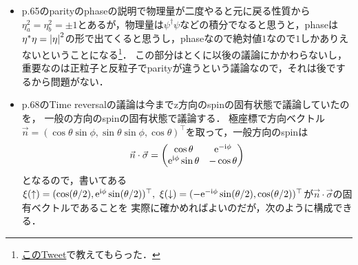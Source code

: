 \begin{itemize}
	\item p.65のparityのphaseの説明で物理量が二度やると元に戻る性質から$\eta_a^2 = \eta_b^2 = \pm1$とあるが，物理量は$\psi^{\dagger}\psi$などの積分でなると思うと，phaseは$\eta^{*}\eta = \abs{\eta}^2$の形で出てくると思うし，phaseなので絶対値$1$なので$1$しかありえないということになる\footnote{\href{https://twitter.com/san_wkwk/status/1596176870751752192?s=20&t=r0nJYSPKDf_OSyPgOmz2oA}{このTweet}で教えてもらった．}．
		この部分はとくに以後の議論にかかわらないし，重要なのは正粒子と反粒子でparityが違うという議論なので，それは後でするから問題がない．
	\item p.68のTime reversalの議論は今までz方向のspinの固有状態で議論していたのを，
		一般の方向のspinの固有状態で議論する．
		極座標で方向ベクトル$\vec{n} = (\cos\theta\sin\phi, \sin\theta\sin\phi, \cos\theta)^{\top}$を取って，一般方向のspinは
		\begin{equation}
			\vec{n}\cdot\vec{\sigma} = \mqty(\cos\theta & \e^{-\i\phi}\\
			\e^{\i\phi}\sin\theta & -\cos\theta)
		\end{equation}
		となるので，書いてある$\xi(\uparrow) = (\cos(\theta/2), \mathrm{e}^{\mathrm{i}\phi}\sin(\theta/2))^{\top},\ \xi(\downarrow) = (-\mathrm{e}^{-\mathrm{i}\phi}\sin(\theta/2), \cos(\theta/2))^{\top}$が$\vec{n}\cdot\vec{\sigma}$の固有ベクトルであることを
		実際に確かめればよいのだが，次のように構成できる．
		

\end{itemize}
